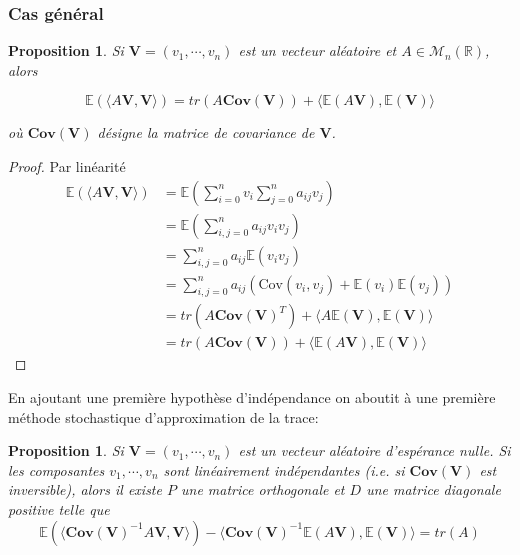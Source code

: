 \documentclass[12pt,a4paper]{article}
\newtheorem{prop}[dfn]{\textbf{Proposition}}
\numberwithin{equation}{section}
\begin{document}
\subsubsection{Cas général}
\begin{prop} \label{Hutchinson} 
    Si $\textbf{V}= (v_1,\cdots,v_n)$ est un vecteur aléatoire et $A\in\mathcal{M}_n(\mathbb{R})$, alors
    
    $$\mathbb{E}\left(\langle A\textbf{V},\textbf{V}\rangle \right) = tr(A\textbf{Cov}(\textbf{V})) + \langle \mathbb{E}(A\textbf{V}),  \mathbb{E}(\textbf{V})\rangle$$

    où $\textbf{Cov}(\textbf{V})$ désigne la matrice de covariance de $\textbf{V}$.

    
    
\end{prop}
\begin{proof} Par linéarité
    \begin{align*}
        \mathbb{E}\left(\langle A\textbf{V},\textbf{V}\rangle \right) 
        &= \mathbb{E}\left(\sum_{i = 0}^n v_i\sum_{j = 0}^na_{ij}v_j\right) \\
        &= \mathbb{E}\left(\sum_{i , j= 0}^na_{ij}v_iv_j\right)\\
        &= \sum_{i , j= 0}^na_{ij}\mathbb{E}\left(v_iv_j\right)\\
        &=  \sum_{i , j= 0}^na_{ij}\left(\text{Cov}(v_i,v_j) + \mathbb{E}(v_i)\mathbb{E}(v_j)\right)\\
        &=  tr(A\textbf{Cov}(\textbf{V})^T) + \langle A\mathbb{E}(\textbf{V}), \mathbb{E}(\textbf{V})\rangle\\
        &=  tr(A\textbf{Cov}(\textbf{V})) + \langle \mathbb{E}(A\textbf{V}), \mathbb{E}(\textbf{V})\rangle
    \end{align*}
\end{proof}
En ajoutant une première hypothèse d'indépendance on aboutit à une première méthode stochastique d'approximation de la trace:
\begin{prop}
    Si $\textbf{V}= (v_1,\cdots,v_n)$ est un vecteur aléatoire d'espérance nulle. Si les composantes $v_1, \cdots, v_n$ sont linéairement indépendantes (i.e. si $\textbf{Cov}(\textbf{V})$ est inversible), alors il existe $P$ une matrice orthogonale et $D$ une matrice diagonale positive telle que
    $$\mathbb{E}(\langle \textbf{Cov}(\textbf{V})^{-1}A\textbf{V},\textbf{V}\rangle)- \langle \textbf{Cov}(\textbf{V})^{-1}\mathbb{E}(A\textbf{V}), \mathbb{E}(\textbf{V})\rangle=tr(A) $$
    
\end{prop}
\end{document}
